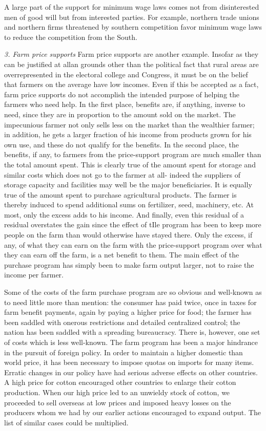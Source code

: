 \documentclass[11pt,openany]{book}
\begin{document}
A large part of the support for minimum wage laws comes not from disinterested men of good will but from interested parties. For example, northern trade unions and northern firms threatened by southern competition favor minimum wage laws to reduce the competition from the South.

\emph{3. Farm price supports} Farm price supports are another example. Insofar as they can be justified at allan grounds other than the political fact that rural areas are overrepresented in the electoral college and Congress, it must be on the belief that farmers on the average have low incomes. Even if this be accepted as a fact, farm price supports do not accomplish the intended purpose of helping the farmers who need help. In the first place, benefits are, if anything, inverse to need, since they are in proportion to the amount sold on the market. The impecunious farmer not only sells less on the market than the wealthier farmer; in addition, he gets a larger fraction of his income from products grown for his own use, and these do not qualify for the benefits. In the second place, the benefits, if any, to farmers from the price-support program are much smaller than the total amount spent. This is clearly true of the amount spent for storage and similar costs which does not go to the farmer at all- indeed the suppliers of storage capacity and facilities may well be the major beneficiaries. It is equally true of the amount spent to purchase agricultural products. The farmer is thereby induced to spend additional sums on fertilizer, seed, machinery, etc. At most, only the excess adds to his income. And finally, even this residual of a residual overstates the gain since the effect of tIle program has been to keep more people on the farm than would otherwise have stayed there. Only the excess, if any, of what they can earn on the farm with the price-support program over what they can earn off the farm, is a net benefit to them. The main effect of the purchase program has simply been to make farm output larger, not to raise the income per farmer.

Some of the costs of the farm purchase program are so obvious and well-known as to need little more than mention: the consumer has paid twice, once in taxes for farm benefit payments, again by paying a higher price for food; the farmer has been saddled with onerous restrictions and detailed centralized control; the nation has been saddled with a spreading bureaucracy. There is, however, one set of costs which is less well-known. The farm program has been a major hindrance in the pursuit of foreign policy. In order to maintain a higher domestic than world price, it has been necessary to impose quotas on imports for many items. Erratic changes in our policy have had serious adverse effects on other countries. A high price for cotton encouraged other countries to enlarge their cotton production. When our high price led to an unwieldy stock of cotton, we proceeded to sell overseas at low prices and imposed heavy losses on the producers whom we had by our earlier actions encouraged to expand output. The list of similar cases could be multiplied.
\end{document}
